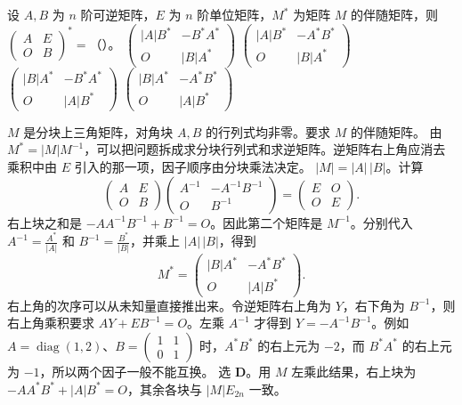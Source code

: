 \documentclass[UTF8,zihao=-4,fontset=fandol]{ctexart}
\begin{document}
设 $A,B$ 为 $n$ 阶可逆矩阵，$E$ 为 $n$ 阶单位矩阵，$M^*$ 为矩阵 $M$ 的伴随矩阵，则 $\begin{pmatrix}A&E\\O&B\end{pmatrix}^{*}=$（\quad）。
\Choices
  {$\begin{pmatrix}|A|B^*&-B^*A^*\\O&|B|A^*\end{pmatrix}$}
  {$\begin{pmatrix}|A|B^*&-A^*B^*\\O&|B|A^*\end{pmatrix}$}
  {$\begin{pmatrix}|B|A^*&-B^*A^*\\O&|A|B^*\end{pmatrix}$}
  {$\begin{pmatrix}|B|A^*&-A^*B^*\\O&|A|B^*\end{pmatrix}$}

\Solution
\Known $M$ 是分块上三角矩阵，对角块 $A,B$ 的行列式均非零。要求 $M$ 的伴随矩阵。
\Method 由 $M^*=|M|M^{-1}$，可以把问题拆成求分块行列式和求逆矩阵。逆矩阵右上角应消去乘积中由 $E$ 引入的那一项，因子顺序由分块乘法决定。
\Derive $|M|=|A|\,|B|$。计算
\[
\begin{pmatrix}A&E\\O&B\end{pmatrix}
\begin{pmatrix}A^{-1}&-A^{-1}B^{-1}\\O&B^{-1}\end{pmatrix}
=\begin{pmatrix}E&O\\O&E\end{pmatrix}.
\]
右上块之和是 $-AA^{-1}B^{-1}+B^{-1}=O$。因此第二个矩阵是 $M^{-1}$。分别代入 $A^{-1}=\frac{A^*}{|A|}$ 和 $B^{-1}=\frac{B^*}{|B|}$，并乘上 $|A|\,|B|$，得到
\[
M^*=\begin{pmatrix}|B|A^*&-A^*B^*\\O&|A|B^*\end{pmatrix}.
\]
右上角的次序可以从未知量直接推出来。令逆矩阵右上角为 $Y$，右下角为 $B^{-1}$，则右上角乘积要求 $AY+EB^{-1}=O$。左乘 $A^{-1}$ 才得到 $Y=-A^{-1}B^{-1}$。例如 $A=\operatorname{diag}(1,2)$、$B=\begin{pmatrix}1&1\\0&1\end{pmatrix}$ 时，$A^*B^*$ 的右上元为 $-2$，而 $B^*A^*$ 的右上元为 $-1$，所以两个因子一般不能互换。
\Verify 选 \textbf{D}。用 $M$ 左乘此结果，右上块为 $-AA^*B^*+|A|B^*=O$，其余各块与 $|M|E_{2n}$ 一致。
\end{document}
